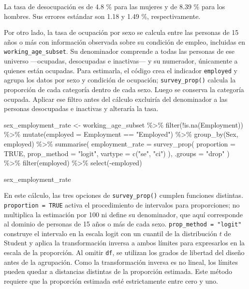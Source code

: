 \documentclass[
  spanish,
  11pt,
  letterpaper,
  oneside,
  open=any]{scrbook}
\newenvironment{Shaded}{\begin{snugshade}}{\end{snugshade}}
\newcommand{\AttributeTok}[1]{\textcolor[rgb]{0.40,0.45,0.13}{#1}}
\newcommand{\ConstantTok}[1]{\textcolor[rgb]{0.56,0.35,0.01}{#1}}
\newcommand{\FunctionTok}[1]{\textcolor[rgb]{0.28,0.35,0.67}{#1}}
\newcommand{\NormalTok}[1]{\textcolor[rgb]{0.00,0.23,0.31}{#1}}
\newcommand{\OtherTok}[1]{\textcolor[rgb]{0.00,0.23,0.31}{#1}}
\newcommand{\SpecialCharTok}[1]{\textcolor[rgb]{0.37,0.37,0.37}{#1}}
\newcommand{\StringTok}[1]{\textcolor[rgb]{0.13,0.47,0.30}{#1}}
\begin{document}
La tasa de desocupación es de 4.8 \% para las mujeres y de 8.39 \% para
los hombres. Sus errores estándar son 1.18 y 1.49 \%, respectivamente.

Por otro lado, la tasa de ocupación por sexo se calcula entre las
personas de 15 años o más con información observada sobre su condición
de empleo, incluidas en \texttt{working\_age\_subset}. Su denominador
comprende a todas las personas de ese universo ---ocupadas, desocupadas
e inactivas--- y su numerador, únicamente a quienes están ocupadas. Para
estimarla, el código crea el indicador \texttt{employed} y agrupa los
datos por sexo y condición de ocupación; \texttt{survey\_prop()} calcula
la proporción de cada categoría dentro de cada sexo. Luego se conserva
la categoría ocupada. Aplicar ese filtro antes del cálculo excluiría del
denominador a las personas desocupadas e inactivas y alteraría la tasa.

\begin{Shaded}
\begin{Highlighting}[]
\NormalTok{sex\_employment\_rate }\OtherTok{\textless{}{-}}\NormalTok{ working\_age\_subset }\SpecialCharTok{\%\textgreater{}\%}
  \FunctionTok{filter}\NormalTok{(}\SpecialCharTok{!}\FunctionTok{is.na}\NormalTok{(Employment)) }\SpecialCharTok{\%\textgreater{}\%}
  \FunctionTok{mutate}\NormalTok{(}\AttributeTok{employed =}\NormalTok{ Employment }\SpecialCharTok{==} \StringTok{"Employed"}\NormalTok{) }\SpecialCharTok{\%\textgreater{}\%}
  \FunctionTok{group\_by}\NormalTok{(Sex, employed) }\SpecialCharTok{\%\textgreater{}\%}
  \FunctionTok{summarise}\NormalTok{(}
    \AttributeTok{employment\_rate =} \FunctionTok{survey\_prop}\NormalTok{(}
      \AttributeTok{proportion =} \ConstantTok{TRUE}\NormalTok{,}
      \AttributeTok{prop\_method =} \StringTok{"logit"}\NormalTok{,}
      \AttributeTok{vartype =} \FunctionTok{c}\NormalTok{(}\StringTok{"se"}\NormalTok{, }\StringTok{"ci"}\NormalTok{)}
\NormalTok{    ),}
    \AttributeTok{.groups =} \StringTok{"drop"}
\NormalTok{  ) }\SpecialCharTok{\%\textgreater{}\%}
  \FunctionTok{filter}\NormalTok{(employed) }\SpecialCharTok{\%\textgreater{}\%}
  \FunctionTok{select}\NormalTok{(}\SpecialCharTok{{-}}\NormalTok{employed)}

\NormalTok{sex\_employment\_rate}
\end{Highlighting}
\end{Shaded}

En este cálculo, las tres opciones de \texttt{survey\_prop()} cumplen
funciones distintas. \texttt{proportion\ =\ TRUE} activa el
procedimiento de intervalos para proporciones; no multiplica la
estimación por 100 ni define su denominador, que aquí corresponde al
dominio de personas de 15 años o más de cada sexo.
\texttt{prop\_method\ =\ "logit"} construye el intervalo en la escala
logit con un cuantil de la distribución \(t\) de Student y aplica la
transformación inversa a ambos límites para expresarlos en la escala de
la proporción. Al omitir \texttt{df}, se utilizan los grados de libertad
del diseño antes de la agrupación. Como la transformación inversa es no
lineal, los límites pueden quedar a distancias distintas de la
proporción estimada. Este método requiere que la proporción estimada
esté estrictamente entre cero y uno.
\end{document}
